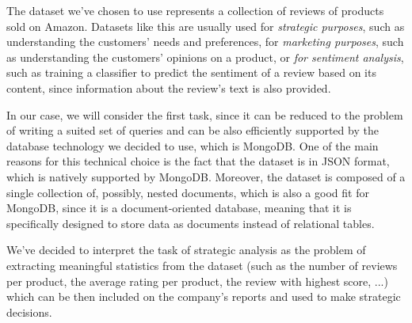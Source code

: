 The dataset we've chosen to use represents a collection of reviews of products sold on Amazon. 
Datasets like this are usually used for \textit{strategic purposes}, such as understanding the customers' needs and preferences, for \textit{marketing purposes}, such as understanding the customers' opinions on a product, or \textit{for sentiment analysis}, such as training a classifier to predict the sentiment of a review based on its content, since information about the review's text is also provided.

In our case, we will consider the first task, since it can be reduced to the problem of writing a suited set of queries and can be also efficiently supported by the database technology we decided to use, which is MongoDB.
One of the main reasons for this technical choice is the fact that the dataset is in JSON format, which is natively supported by MongoDB. 
Moreover, the dataset is composed of a single collection of, possibly, nested documents, which is also a good fit for MongoDB, since it is a document-oriented database, meaning that it is specifically designed to store data as documents instead of relational tables.

We've decided to interpret the task of strategic analysis as the problem of extracting meaningful statistics from the dataset (such as the number of reviews per product, the average rating per product, the review with highest score, ...) which can be then included on the company's reports and used to make strategic decisions.